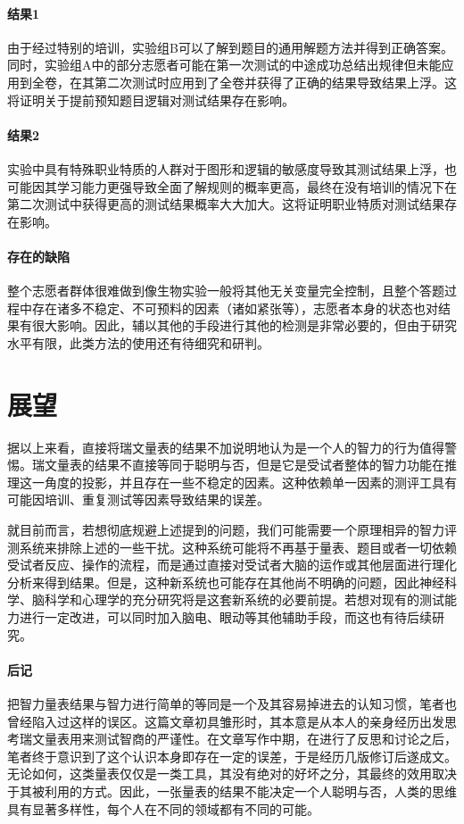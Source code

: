 \documentclass[12pt,a4paper]{article}
\begin{document}
    \paragraph{结果1}由于经过特别的培训，实验组B可以了解到题目的通用解题方法并得到正确答案。同时，实验组A中的部分志愿者可能在第一次测试的中途成功总结出规律但未能应用到全卷，在其第二次测试时应用到了全卷并获得了正确的结果导致结果上浮。这将证明关于提前预知题目逻辑对测试结果存在影响。
    
    \paragraph{结果2}实验中具有特殊职业特质的人群对于图形和逻辑的敏感度导致其测试结果上浮，也可能因其学习能力更强导致全面了解规则的概率更高，最终在没有培训的情况下在第二次测试中获得更高的测试结果概率大大加大。这将证明职业特质对测试结果存在影响。

    \paragraph{存在的缺陷}整个志愿者群体很难做到像生物实验一般将其他无关变量完全控制，且整个答题过程中存在诸多不稳定、不可预料的因素（诸如紧张等），志愿者本身的状态也对结果有很大影响。因此，辅以其他的手段进行其他的检测是非常必要的，但由于研究水平有限，此类方法的使用还有待细究和研判。

\section{展望}

	据以上来看，直接将瑞文量表的结果不加说明地认为是一个人的智力的行为值得警惕。瑞文量表的结果不直接等同于聪明与否，但是它是受试者整体的智力功能在推理这一角度的投影，并且存在一些不稳定的因素。这种依赖单一因素的测评工具有可能因培训、重复测试等因素导致结果的误差。
    
	就目前而言，若想彻底规避上述提到的问题，我们可能需要一个原理相异的智力评测系统来排除上述的一些干扰。这种系统可能将不再基于量表、题目或者一切依赖受试者反应、操作的流程，而是通过直接对受试者大脑的运作或其他层面进行理化分析来得到结果。但是，这种新系统也可能存在其他尚不明确的问题，因此神经科学、脑科学和心理学的充分研究将是这套新系统的必要前提。若想对现有的测试能力进行一定改进，可以同时加入脑电、眼动等其他辅助手段，而这也有待后续研究。

\printbibliography[title={参考文献}]

\paragraph{后记} 把智力量表结果与智力进行简单的等同是一个及其容易掉进去的认知习惯，笔者也曾经陷入过这样的误区。这篇文章初具雏形时，其本意是从本人的亲身经历出发思考瑞文量表用来测试智商的严谨性。在文章写作中期，在进行了反思和讨论之后，笔者终于意识到了这个认识本身即存在一定的误差，于是经历几版修订后遂成文。无论如何，这类量表仅仅是一类工具，其没有绝对的好坏之分，其最终的效用取决于其被利用的方式。因此，一张量表的结果不能决定一个人聪明与否，人类的思维具有显著多样性，每个人在不同的领域都有不同的可能。
\end{document}
